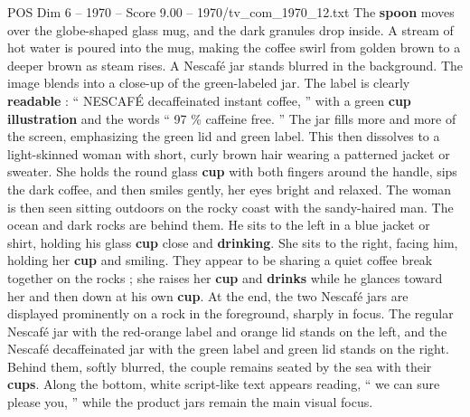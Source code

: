 \begin{textsample}{POS Dim 6 – 1970 – Score 9.00 – 1970/tv\_com\_1970\_12.txt}
The \textbf{spoon} moves over the globe-shaped glass mug, and the dark granules drop inside.
A stream of hot water is poured into the mug, making the coffee swirl from golden brown to a deeper brown as steam rises.
A Nescafé jar stands blurred in the background.
The image blends into a close-up of the green-labeled jar.
The label is clearly \textbf{readable} : “ NESCAFÉ decaffeinated instant coffee, ” with a green \textbf{cup} \textbf{illustration} and the words “ 97 \% caffeine free. ” The jar fills more and more of the screen, emphasizing the green lid and green label.
This then dissolves to a light-skinned woman with short, curly brown hair wearing a patterned jacket or sweater.
She holds the round glass \textbf{cup} with both fingers around the handle, sips the dark coffee, and then smiles gently, her eyes bright and relaxed.
The woman is then seen sitting outdoors on the rocky coast with the sandy-haired man.
The ocean and dark rocks are behind them.
He sits to the left in a blue jacket or shirt, holding his glass \textbf{cup} close and \textbf{drinking}.
She sits to the right, facing him, holding her \textbf{cup} and smiling.
They appear to be sharing a quiet coffee break together on the rocks ; she raises her \textbf{cup} and \textbf{drinks} while he glances toward her and then down at his own \textbf{cup}.
At the end, the two Nescafé jars are displayed prominently on a rock in the foreground, sharply in focus.
The regular Nescafé jar with the red-orange label and orange lid stands on the left, and the Nescafé decaffeinated jar with the green label and green lid stands on the right.
Behind them, softly blurred, the couple remains seated by the sea with their \textbf{cups}.
Along the bottom, white script-like text appears reading, “ we can sure please you, ” while the product jars remain the main visual focus.

\end{textsample}
